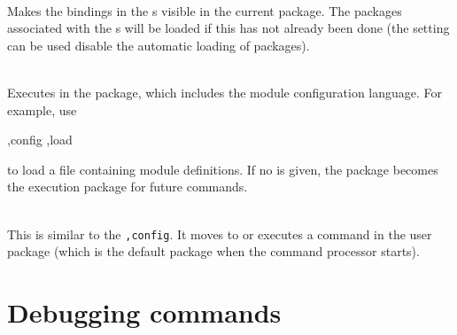 \begin{description}
\item {}\\
Makes the bindings in the s visible in the current package.
The packages associated with the s will be loaded if
 this has not already been done (the  setting
 can be used disable the automatic loading of packages).

\item {}\\
Executes  in the  package, which includes
 the module configuration language.
For example, use
\begin{example}
,config ,load 
\end{example}
to load a file containing module definitions.
If no  is given, the  package becomes the
 execution package for future commands.

\item {} \\
    This is similar to the {\tt ,config}.  It
    moves to or executes a command in the user package (which is the
    default package when the \hack{} command processor starts).

\end{description}

\section{Debugging commands}
\label{debug-commands}

